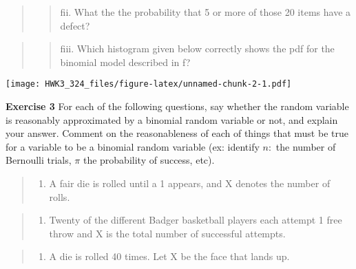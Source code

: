 \documentclass[
]{article}
\providecommand{\tightlist}{%
  \setlength{\itemsep}{0pt}\setlength{\parskip}{0pt}}
\begin{document}
\begin{quote}
\begin{quote}
fii. What the the probability that 5 or more of those 20 items have a
defect?
\end{quote}
\end{quote}

\begin{quote}
\begin{quote}
fiii. Which histogram given below correctly shows the pdf for the
binomial model described in f?
\end{quote}
\end{quote}

\texttt{[image: HWK3\_324\_files/figure-latex/unnamed-chunk-2-1.pdf]}

\vspace{.5 cm}

\textbf{Exercise 3} For each of the following questions, say whether the
random variable is reasonably approximated by a binomial random variable
or not, and explain your answer. Comment on the reasonableness of each
of things that must be true for a variable to be a binomial random
variable (ex: identify \(n:\) the number of Bernoulli trials, \(\pi\)
the probability of success, etc).

\begin{quote}
\begin{enumerate}
\def\labelenumi{\alph{enumi}.}
\tightlist
\item
  A fair die is rolled until a 1 appears, and X denotes the number of
  rolls.
\end{enumerate}
\end{quote}

\begin{quote}
\begin{enumerate}
\def\labelenumi{\alph{enumi}.}
\setcounter{enumi}{1}
\tightlist
\item
  Twenty of the different Badger basketball players each attempt 1 free
  throw and X is the total number of successful attempts.
\end{enumerate}
\end{quote}

\begin{quote}
\begin{enumerate}
\def\labelenumi{\alph{enumi}.}
\setcounter{enumi}{2}
\tightlist
\item
  A die is rolled 40 times. Let X be the face that lands up.
\end{enumerate}
\end{quote}
\end{document}

